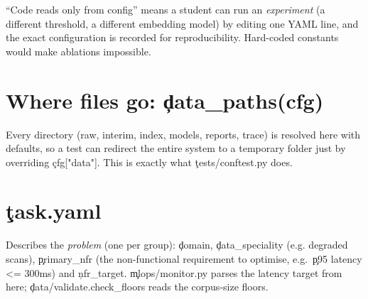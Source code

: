 \begin{why}
``Code reads only from config'' means a student can run an \emph{experiment} (a different threshold, a different embedding model) by editing one YAML line, and the exact configuration is recorded for reproducibility. Hard-coded constants would make ablations impossible.
\end{why}

\section{Where files go: \c{data\_paths(cfg)}}
Every directory (raw, interim, index, models, reports, trace) is resolved here with defaults, so a test can redirect the entire system to a temporary folder just by overriding \c{cfg["data"]}. This is exactly what \c{tests/conftest.py} does.

\section{\c{task.yaml}}
Describes the \emph{problem} (one per group): \c{domain}, \c{data\_speciality} (e.g. degraded scans), \c{primary\_nfr} (the non-functional requirement to optimise, e.g.\ \c{p95 latency <= 300ms}) and \c{nfr\_target}. \c{mlops/monitor.py} parses the latency target from here; \c{data/validate.check\_floors} reads the corpus-size floors.

